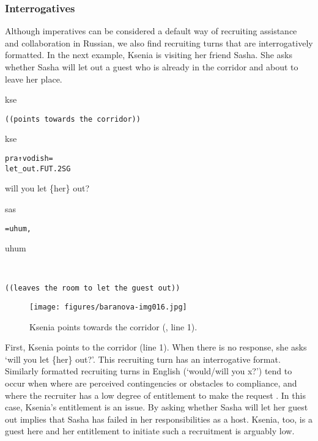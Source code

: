 \documentclass[output=paper,modfonts,nonflat]{langsci/langscibook}
\begin{document}
\subsubsection{Interrogatives}

Although imperatives can be considered a default way of recruiting assistance and collaboration in Russian, we also find recruiting turns that are interrogatively formatted. In the next example, Ksenia is visiting her friend Sasha. She asks whether Sasha will let out a guest who is already in the corridor and about to leave her place.

\vspace{2mm}
%
\begin{transbox}{1}{kse}
\begin{verbatim}
((points towards the corridor))
\end{verbatim}
\end{transbox}
%
%
\begin{transbox}{3}{kse}
\begin{verbatim}
pra↑vodish=
let_out.FUT.2SG
\end{verbatim}
will you let \{her\} out?
\end{transbox}
%
\begin{transbox}{4}{sas}
\begin{verbatim}
=uhum,
\end{verbatim}
\hspace{0.07cm} uhum
\end{transbox}
%
\begin{transbox}{5}{~}
\begin{verbatim}
((leaves the room to let the guest out))
\end{verbatim}
\end{transbox}\bigskip

\begin{figure}
\texttt{[image: figures/baranova-img016.jpg]}
\caption{Ksenia points towards the corridor (, line 1).}
\label{fig:baranova:16}
\end{figure}

First, Ksenia points to the corridor (line 1). When there is no response, she asks ‘will you let \{her\} out?’. This recruiting turn has an interrogative format. Similarly formatted recruiting turns in English (‘would/will you x?’) tend to occur when where are perceived contingencies or obstacles to compliance, and where the recruiter has a low degree of entitlement to make the request \citep{CurlDrew2008}. In this case, Ksenia’s entitlement is an issue. By asking whether Sasha will let her guest out implies that Sasha has failed in her responsibilities as a host. Ksenia, too, is a guest here and her entitlement to initiate such a recruitment is arguably low.
\end{document}
